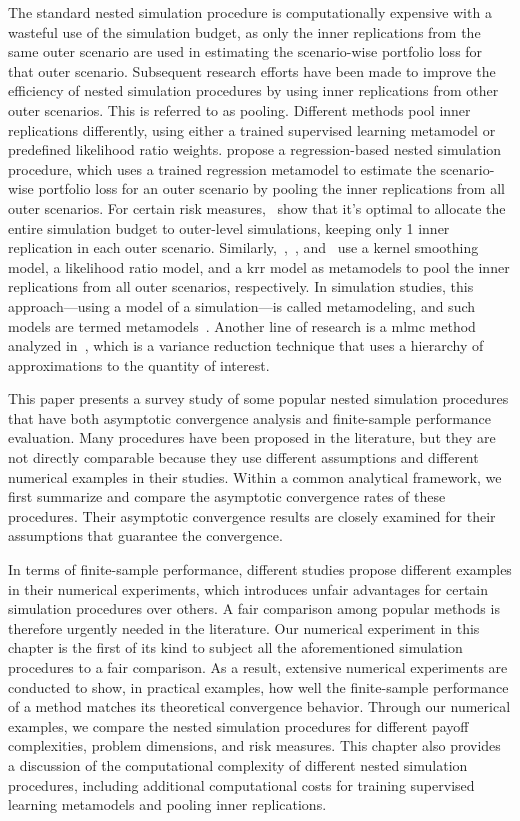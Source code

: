 The standard nested simulation procedure is computationally expensive with a wasteful use of the simulation budget, as only the inner replications from the same outer scenario are used in estimating the scenario-wise portfolio loss for that outer scenario.
Subsequent research efforts have been made to improve the efficiency of nested simulation procedures by using inner replications from other outer scenarios.
This is referred to as pooling.
Different methods pool inner replications differently, using either a trained supervised learning metamodel or predefined likelihood ratio weights.
\cite{broadie2015risk} propose a regression-based nested simulation procedure, which uses a trained regression metamodel to estimate the scenario-wise portfolio loss for an outer scenario by pooling the inner replications from all outer scenarios.
For certain risk measures,~\cite{broadie2015risk} show that it's optimal to allocate the entire simulation budget to outer-level simulations, keeping only 1 inner replication in each outer scenario.
Similarly,~\cite{hong2017kernel},~\cite{feng2020optimal}, and~\cite{zhang2022sample} use a kernel smoothing model, a likelihood ratio model, and a \gls{krr} model as metamodels to pool the inner replications from all outer scenarios, respectively.
In simulation studies, this approach—using a model of a simulation—is called metamodeling, and such models are termed metamodels~\citep{barton1998simulation}.
Another line of research is a \gls{mlmc} method analyzed in~\cite{giles2019multilevel}, which is a variance reduction technique that uses a hierarchy of approximations to the quantity of interest.

This paper presents a survey study of some popular nested simulation procedures that have both asymptotic convergence analysis and finite-sample performance evaluation.
Many procedures have been proposed in the literature, but they are not directly comparable because they use different assumptions and different numerical examples in their studies.
Within a common analytical framework, we first summarize and compare the asymptotic convergence rates of these procedures.
Their asymptotic convergence results are closely examined for their assumptions that guarantee the convergence.

In terms of finite-sample performance, different studies propose different examples in their numerical experiments, which introduces unfair advantages for certain simulation procedures over others. 
A fair comparison among popular methods is therefore urgently needed in the literature. 
Our numerical experiment in this chapter is the first of its kind to subject all the aforementioned simulation procedures to a fair comparison. 
As a result, extensive numerical experiments are conducted to show, in practical examples, how well the finite-sample performance of a method matches its theoretical convergence behavior. 
Through our numerical examples, we compare the nested simulation procedures for different payoff complexities, problem dimensions, and risk measures. 
This chapter also provides a discussion of the computational complexity of different nested simulation procedures, including additional computational costs for training supervised learning metamodels and pooling inner replications.

